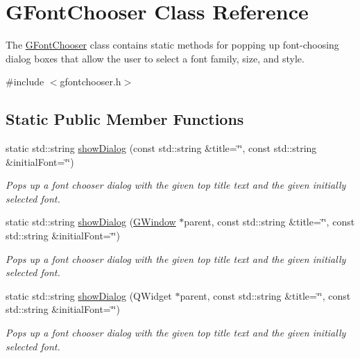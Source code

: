 \hypertarget{classsgl_1_1GFontChooser}{}\section{G\+Font\+Chooser Class Reference}
\label{classsgl_1_1GFontChooser}


The \mbox{\hyperlink{classsgl_1_1GFontChooser}{G\+Font\+Chooser}} class contains static methods for popping up font-\/choosing dialog boxes that allow the user to select a font family, size, and style.  




{\ttfamily \#include $<$gfontchooser.\+h$>$}

\subsection*{Static Public Member Functions}
\begin{DoxyCompactItemize}
\item 
static std\+::string \mbox{\hyperlink{classsgl_1_1GFontChooser_a93eece7081780910ac5878dc6c809f94}{show\+Dialog}} (const std\+::string \&title=\char`\"{}\char`\"{}, const std\+::string \&initial\+Font=\char`\"{}\char`\"{})
\begin{DoxyCompactList}\small\item\em Pops up a font chooser dialog with the given top title text and the given initially selected font. \end{DoxyCompactList}\item 
static std\+::string \mbox{\hyperlink{classsgl_1_1GFontChooser_a67dee62efca9f2c7fb6d80891a73c32f}{show\+Dialog}} (\mbox{\hyperlink{classsgl_1_1GWindow}{G\+Window}} $\ast$parent, const std\+::string \&title=\char`\"{}\char`\"{}, const std\+::string \&initial\+Font=\char`\"{}\char`\"{})
\begin{DoxyCompactList}\small\item\em Pops up a font chooser dialog with the given top title text and the given initially selected font. \end{DoxyCompactList}\item 
static std\+::string \mbox{\hyperlink{classsgl_1_1GFontChooser_a7e0ac529f6e2c4877b13e7a2f06a1bea}{show\+Dialog}} (Q\+Widget $\ast$parent, const std\+::string \&title=\char`\"{}\char`\"{}, const std\+::string \&initial\+Font=\char`\"{}\char`\"{})
\begin{DoxyCompactList}\small\item\em Pops up a font chooser dialog with the given top title text and the given initially selected font. \end{DoxyCompactList}\end{DoxyCompactItemize}


